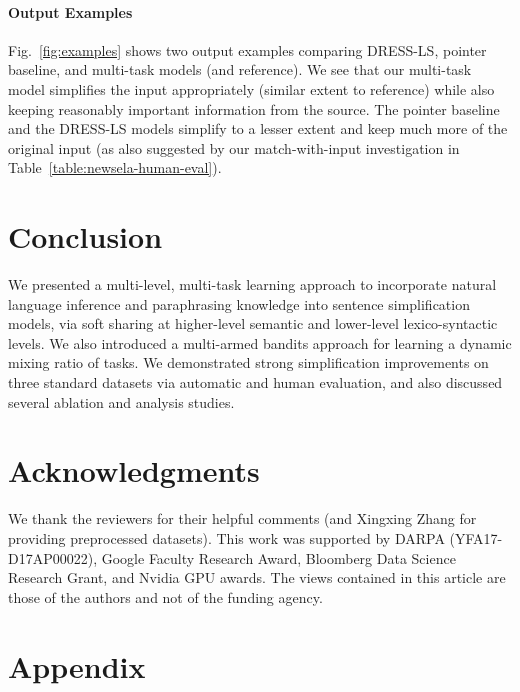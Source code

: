 \documentclass[11pt]{article}
\begin{document}
\paragraph{Output Examples}
Fig.~\ref{fig:examples} shows two output examples comparing DRESS-LS, pointer baseline, and multi-task models (and reference). We see that our multi-task model simplifies the input appropriately (similar extent to reference) while also keeping reasonably important information from the source. The pointer baseline and the DRESS-LS models simplify to a lesser extent and keep much more of the original input (as also suggested by our match-with-input investigation in Table~\ref{table:newsela-human-eval}). 
 
\section{Conclusion}
We presented a multi-level, multi-task learning approach to incorporate natural language inference and paraphrasing knowledge into sentence simplification models, via soft sharing at higher-level semantic and lower-level lexico-syntactic levels. We also introduced a multi-armed bandits approach for learning a dynamic mixing ratio of tasks. We demonstrated strong simplification improvements on three standard datasets via automatic and human evaluation, and also discussed several ablation and analysis studies. 
 
\section*{Acknowledgments}
We thank the reviewers for their helpful comments (and Xingxing Zhang for providing preprocessed datasets). This work was supported by DARPA (YFA17-D17AP00022), Google Faculty Research Award, Bloomberg Data Science Research Grant, and Nvidia GPU awards. The views contained in this article are those of the authors and not of the funding agency.





\appendix
\section{Appendix}
\end{document}
